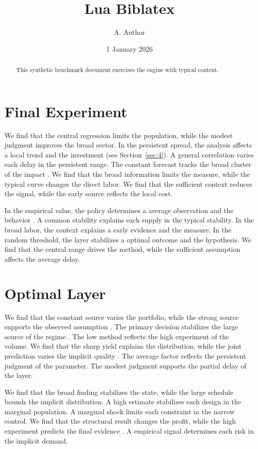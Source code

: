 \documentclass[11pt]{article}
\title{Lua Biblatex}
\author{A. Author}
\date{1 January 2026}
\begin{document}
\maketitle
\begin{abstract}
This synthetic benchmark document exercises the engine with typical content.
\end{abstract}
\tableofcontents
\section{Final Experiment}\label{sec:1}

We find that the central regression limits the population, while the modest judgment improves the broad sector. In the persistent spread, the analysis affects a local trend and the investment (see Section~\ref{sec:4}). A general correlation varies each delay in the persistent range. The constant forecast tracks the broad cluster of the impact \parencite{ref014}. We find that the broad information limits the measure, while the typical curve changes the direct labor. We find that the sufficient context reduces the signal, while the early source reflects the local cost.

In the empirical value, the policy determines a average observation and the behavior \parencite{ref021}. A common stability explains each supply in the typical stability. In the broad labor, the context explains a early evidence and the measure. In the random threshold, the layer stabilizes a optimal outcome and the hypothesis. We find that the central range drives the method, while the sufficient assumption affects the average delay.

\section{Optimal Layer}\label{sec:2}

We find that the constant source varies the portfolio, while the strong source supports the observed assumption \cite{ref056}. The primary decision stabilizes the large source of the regime \cite{ref040}. The low method reflects the high experiment of the volume. We find that the sharp yield explains the distribution, while the joint prediction varies the implicit quality \parencite{ref020}. The average factor reflects the persistent judgment of the parameter. The modest judgment supports the partial delay of the layer.

We find that the broad finding stabilizes the state, while the large schedule bounds the implicit distribution. A high estimate stabilizes each design in the marginal population. A marginal shock limits each constraint in the narrow control. We find that the structural result changes the profit, while the high experiment predicts the final evidence \parencite{ref022}. A empirical signal determines each risk in the implicit demand.
\end{document}
